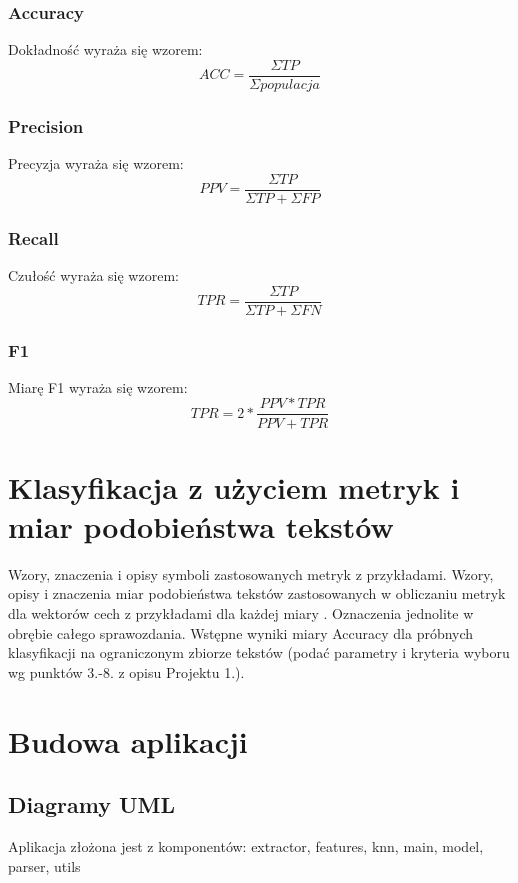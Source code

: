 \documentclass{classrep}
\begin{document}
\subsubsection{Accuracy}
Dokładność wyraża się wzorem:
\begin{equation}
ACC=\frac{\Sigma TP}{\Sigma populacja} \label{eq:eps}
\end{equation}
\subsubsection{Precision}
Precyzja wyraża się wzorem:
\begin{equation}
PPV=\frac{\Sigma TP}{\Sigma TP + \Sigma FP} \label{eq:eps}
\end{equation}
\subsubsection{Recall}
Czułość wyraża się wzorem:
\begin{equation}
TPR=\frac{\Sigma TP}{\Sigma TP + \Sigma FN} \label{eq:eps}
\end{equation}
\subsubsection{F1}
Miarę F1 wyraża się wzorem:
\begin{equation}
TPR=2*\frac{PPV*TPR}{PPV + TPR} \label{eq:eps}
\end{equation}


\section{Klasyfikacja z użyciem metryk i miar podobieństwa tekstów}
Wzory, znaczenia i opisy symboli zastosowanych metryk z
przykładami. Wzory, opisy i znaczenia miar
podobieństwa tekstów zastosowanych w obliczaniu metryk dla wektorów cech z
przykładami dla każdej miary \cite{niewiadomski08}.  Oznaczenia jednolite w obrębie całego sprawozdania.  Wstępne wyniki miary Accuracy dla próbnych klasyfikacji na ograniczonym zbiorze tekstów (podać parametry i kryteria
wyboru wg punktów 3.-8. z opisu Projektu 1.). \\ 

\section{Budowa aplikacji}
\subsection{Diagramy UML}
Aplikacja złożona jest z komponentów: extractor, features, knn, main, model, parser, utils
\end{document}
